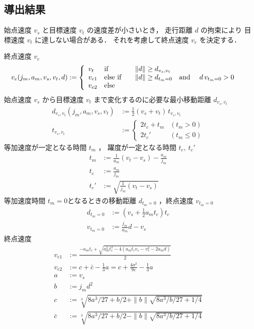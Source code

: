 \documentclass[a5paper]{ltjsarticle}
\begin{document}
\subsection{導出結果}
始点速度 $v_s$ と目標速度 $v_t$ の速度差が小さいとき，
走行距離 $d$ の拘束により
目標速度 $v_t$ に達しない場合がある．
それを考慮して終点速度 $v_e$ を決定する．

終点速度 $v_e$
\begin{align}
    v_e(j_m,a_m,v_s,v_t,d) & :=
    \left\{
    \begin{array}{lll}
        v_t    & \mbox{if\quad}      & \|d\| \geq d_{v_s,v_t}
        \\
        v_{e1} & \mbox{else if\quad} & \|d\| \geq d_{t_m=0} \mbox{\quad and \quad} d\, v_{t_m=0} > 0
        \\
        v_{e2} & \mbox{else}
    \end{array}
    \right.
\end{align}
始点速度 $v_s$ から目標速度 $v_t$ まで変化するのに必要な最小移動距離 $d_{v_s,v_t}$
\begin{align}
    d_{v_s,v_t}(j_m,a_m,v_s,v_t) & := \frac{1}{2}(v_s+v_t) \, t_{v_s,v_t} \\
    t_{v_s,v_t}                  & :=
    \left\{\begin{array}{ll}
        2t_c + t_m & (t_m>0)    \\
        2t_c'      & (t_m\leq0)
    \end{array}\right.
\end{align}
等加速度が一定となる時間 $t_m$ ，
躍度が一定となる時間 $t_c,~t_c'$
\begin{align}
    t_m  & := \frac{1}{a_m}(v_t - v_s) - \frac{a_m}{j_m} \\
    t_c  & := \frac{a_m}{j_m}                            \\
    t_c' & := \sqrt{\frac{1}{j_m}(v_t-v_s)}
\end{align}
等加速度時間 $t_m = 0$となるときの移動距離 $d_{t_m=0}$ ，終点速度 $v_{t_m=0}$
\begin{align}
    d_{t_m=0} & := \left( v_s + \frac{1}{2}a_m t_c \right) t_c
    \\
    v_{t_m=0} & := \frac{j_m}{a_m} d - v_s
\end{align}
終点速度
\begin{align}
    v_{e1}  & := \frac{-a_m t_c + \sqrt{a_m^2 t_c^2-4(a_m t_c v_s - v_s^2 - 2a_m d)}}{2}
    \\
    v_{e2}  & := c +\bar{c} - \frac{1}{3} a = c + \frac{4a^2}{9c} - \frac{1}{3} a
    \\
    a       & := v_s
    \\
    b       & := j_m d^2
    \\
    c       & := \sqrt[3]{8a^3/27+b/2 + \|b\|\sqrt{8a^3/b/27+1/4}}
    \\
    \bar{c} & := \sqrt[3]{8a^3/27+b/2 - \|b\|\sqrt{8a^3/b/27+1/4}}
\end{align}
\end{document}
